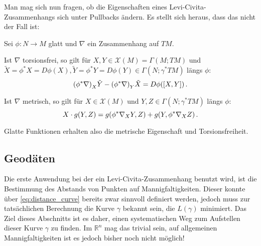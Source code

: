 Man mag sich nun fragen, ob die Eigenschaften eines Levi-Civita-Zusammenhangs sich unter Pullbacks ändern. Es stellt sich heraus, dass das nicht der Fall ist:
\begin{satz}
Sei $\phi: N \rightarrow M$ glatt und $\nabla$ ein Zusammenhang auf $TM$.

Ist $\nabla$ torsionsfrei, so gilt für $X, Y \in \mathcal{X}(M) = \Gamma(M; TM)$ und $\tilde{X} = \phi^* X = D \phi(X), \tilde{Y} = \phi^* Y = D\phi(Y) \in \Gamma(N; \gamma^* TM)$ längs $\phi$:
\begin{equation}
\qty(\phi^* \nabla)_X \tilde{Y} - \qty(\phi^* \nabla)_Y \tilde{X} = D\phi\qty([X, Y]) \, .
\end{equation}

Ist $\nabla$ metrisch, so gilt für $X \in \mathcal{X}(M)$ und $Y, Z \in \Gamma(N; \gamma^* TM)$ längs $\phi$:
\begin{equation}
X \cdot g(Y, Z) = g\qty(\phi^* \nabla_X Y, Z) + g\qty(Y, \phi^* \nabla_X Z) \, .
\end{equation}
\end{satz}

Glatte Funktionen erhalten also die metrische Eigenschaft und Torsionsfreiheit.





		\subsection{Geodäten}
Die erste Anwendung bei der ein Levi-Civita-Zusammenhang benutzt wird, ist die Bestimmung des Abstands von Punkten auf Mannigfaltigkeiten. Dieser konnte über \eqref{eq:distance_curve} bereits zwar sinnvoll definiert werden, jedoch muss zur tatsächlichen Berechnung die Kurve $\gamma$ bekannt sein, die $L(\gamma)$ minimiert. Das Ziel dieses Abschnitts ist es daher, einen systematischen Weg zum Aufstellen dieser Kurve $\gamma$ zu finden. Im $\mathbb{R}^n$ mag das trivial sein, auf allgemeinen Mannigfaltigkeiten ist es jedoch bisher noch nicht möglich!

